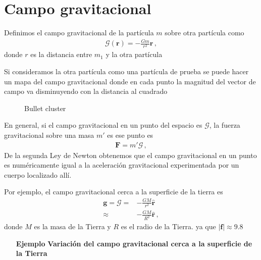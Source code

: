 \section{Campo gravitacional}
Definimos el campo gravitacional de la partícula  $m$ sobre otra partícula como
\begin{align}
\boldsymbol{\mathcal{G}}(\mathbf{r})=-\frac{Gm}{r^2}\hat{\mathbf{r}}\,,
\end{align}
donde $r$ es la distancia entre $m_1$ y la otra partícula

Si consideramos la otra partícula como una partícula de prueba se puede hacer un mapa del campo gravitacional donde en cada punto la magnitud del vector de campo va disminuyendo con la distancia al cuadrado %


\begin{frame}
\begin{figure}
  \centering
  \caption{Bullet cluster}
  \label{fig:bullet}
\end{figure}
\end{frame}

En general, si el campo gravitacional en un punto del espacio es $\boldsymbol{\mathcal{G}}$, la fuerza gravitacional sobre una masa $m'$ es ese punto es
\begin{align}
  \mathbf{F}=m'\boldsymbol{\mathcal{G}}\,,
\end{align}
De la segunda Ley de Newton obtenemos que el campo gravitacional en un punto es numéricamente igual a la aceleración gravitacional experimentada por un cuerpo localizado allí.

Por ejemplo, el campo gravitacional cerca a la superficie de la tierra es
\begin{align}
  \mathbf{g}=\boldsymbol{\mathcal{G}}=&-\frac{GM}{r^2}\hat{\mathbf{r}}\nonumber\\
  \approx&-\frac{GM}{R^2}\hat{\mathbf{r}}\,,
\end{align}
donde $M$ es la masa de la Tierra y $R$ es el radio de la Tierra. ya que $|\mathbf{f}|\approx 9.8$


\begin{itemize}
\item[\textbf{Ejemplo}] \textbf{Variación del campo gravitacional cerca a la superficie de la Tierra} %

\end{itemize}


